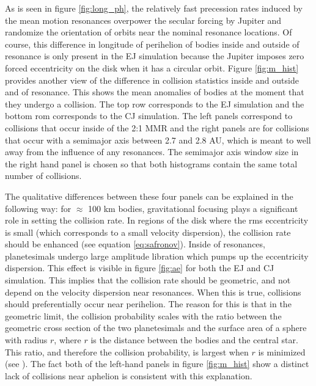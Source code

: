 \documentclass[twocolumn]{aastex63}
\begin{document}
As is seen in figure \ref{fig:long_ph}, the relatively fast precession rates induced by the mean motion resonances overpower the secular forcing by Jupiter and randomize the orientation of orbits near the nominal resonance locations. Of course, this difference in longitude of perihelion of bodies inside and outside of resonance is only present in the EJ simulation because the Jupiter imposes zero forced eccentricity on the disk when it has a circular orbit. Figure \ref{fig:m_hist} provides another view of the difference in collision statistics inside and outside and of resonance. This shows the mean anomalies of bodies at the moment that they undergo a collision. The top row corresponds to the EJ simulation and the bottom rom corresponds to the CJ simulation. The left panels correspond to collisions that occur inside of the 2:1 MMR and the right panels are for collisions that occur with a semimajor axis between 2.7 and 2.8 AU, which is meant to well away from the influence of any resonances. The semimajor axis window size in the right hand panel is chosen so that both histograms contain the same total number of collisions.

The qualitative differences between these four panels can be explained in the following way: for $\approx$ 100 km bodies, gravitational focusing plays a significant role in setting the collision rate. In regions of the disk where the rms eccentricity is small (which corresponds to a small velocity dispersion), the collision rate should be enhanced (see equation \ref{eq:safronov}). Inside of resonances, planetesimals undergo large amplitude libration which pumps up the eccentricity dispersion. This effect is visible in figure \ref{fig:ae} for both the EJ and CJ simulation. This implies that the collision rate should be geometric, and not depend on the velocity dispersion near resonances. When this is true, collisions should preferentially occur near perihelion. The reason for this is that in the geometric limit, the collision probability scales with the ratio between the geometric cross section of the two planetesimals and the surface area of a sphere with radius $r$, where $r$ is the distance between the bodies and the central star. This ratio, and therefore the collision probability, is largest when $r$ is minimized (see \citet{2003AJ....125.2692L}). The fact both of the left-hand panels in figure \ref{fig:m_hist} show a distinct lack of collisions near aphelion is consistent with this explanation.
\end{document}
